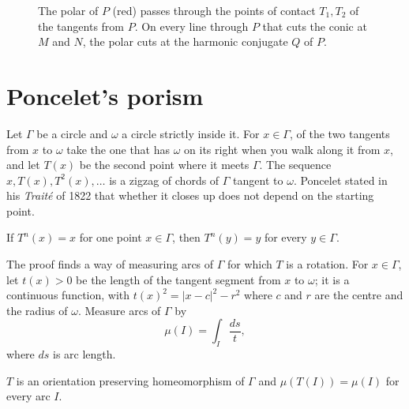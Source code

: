 \begin{figure}[ht]
\centering
{}
\caption{The polar of $P$ (red) passes through the points of contact $T_1,T_2$ of the tangents from $P$. On every line through $P$ that cuts the
conic at $M$ and $N$, the polar cuts at the harmonic conjugate $Q$ of $P$.}
\label{fig:polar}
\end{figure}

\section{Poncelet's porism}

Let $\Gamma$ be a circle and $\omega$ a circle strictly inside it. For $x\in\Gamma$, of the two tangents from $x$ to $\omega$ take the one that has
$\omega$ on its right when you walk along it from $x$, and let $T(x)$ be the second point where it meets $\Gamma$. The sequence $x,T(x),T^2(x),\dots$
is a zigzag of chords of $\Gamma$ tangent to $\omega$. Poncelet stated in his \emph{Trait\'e} of 1822 that whether it closes up does not depend on the
starting point.

\begin{theorem}\label{thm:poncelet}
If $T^n(x)=x$ for one point $x\in\Gamma$, then $T^n(y)=y$ for every $y\in\Gamma$.
\end{theorem}

The proof finds a way of measuring arcs of $\Gamma$ for which $T$ is a rotation. For $x\in\Gamma$, let $t(x)>0$ be the length of the tangent segment
from $x$ to $\omega$; it is a continuous function, with $t(x)^2=|x-c|^2-r^2$ where $c$ and $r$ are the centre and the radius of $\omega$. Measure arcs
of $\Gamma$ by
\[
\mu(I)=\int_I\frac{ds}{t},
\]
where $ds$ is arc length.

\begin{lemma}\label{lem:poncelet}
$T$ is an orientation preserving homeomorphism of $\Gamma$ and $\mu(T(I))=\mu(I)$ for every arc $I$.
\end{lemma}

